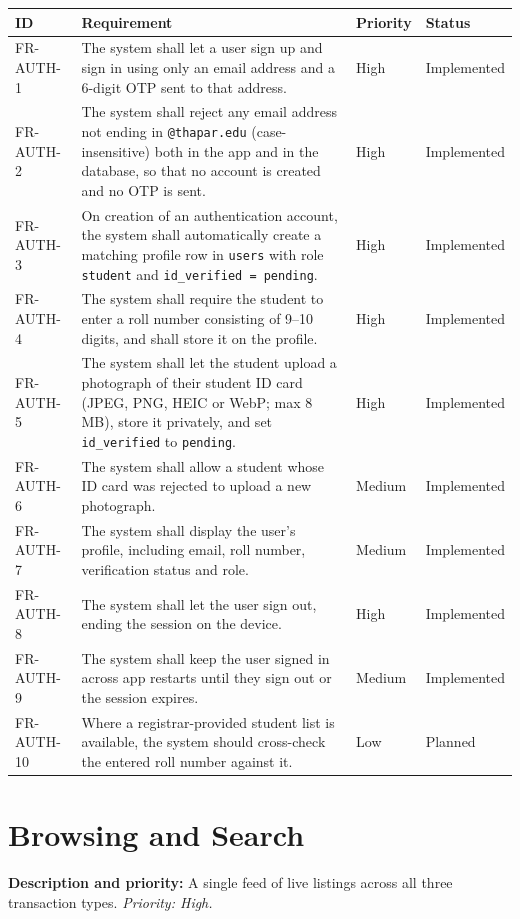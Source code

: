 \documentclass[11pt,a4paper]{scrreprt}
\newenvironment{reqtable}{%
  \small
  \begin{longtable}{>{\raggedright\arraybackslash\ttfamily\footnotesize}p{2.05cm} L{8.85cm} L{1.45cm} L{2.05cm}}
  \toprule
  \normalfont\normalsize\textbf{ID} & \textbf{Requirement} & \textbf{Priority} & \textbf{Status}\\
  \midrule\endhead
  \bottomrule\endfoot
}{\end{longtable}}
\newcommand{\impl}{Implemented}
\newcommand{\planned}{Planned}
\begin{document}
\begin{reqtable}
FR-AUTH-1 & The system shall let a user sign up and sign in using only an email address and a 6-digit OTP sent to that address. & High & \impl\\
FR-AUTH-2 & The system shall reject any email address not ending in \texttt{@thapar.edu} (case-insensitive) both in the app and in the database, so that no account is created and no OTP is sent. & High & \impl\\
FR-AUTH-3 & On creation of an authentication account, the system shall automatically create a matching profile row in \texttt{users} with role \texttt{student} and \texttt{id_verified = pending}. & High & \impl\\
FR-AUTH-4 & The system shall require the student to enter a roll number consisting of 9--10 digits, and shall store it on the profile. & High & \impl\\
FR-AUTH-5 & The system shall let the student upload a photograph of their student ID card (JPEG, PNG, HEIC or WebP; max 8 MB), store it privately, and set \texttt{id_verified} to \texttt{pending}. & High & \impl\\
FR-AUTH-6 & The system shall allow a student whose ID card was rejected to upload a new photograph. & Medium & \impl\\
FR-AUTH-7 & The system shall display the user's profile, including email, roll number, verification status and role. & Medium & \impl\\
FR-AUTH-8 & The system shall let the user sign out, ending the session on the device. & High & \impl\\
FR-AUTH-9 & The system shall keep the user signed in across app restarts until they sign out or the session expires. & Medium & \impl\\
FR-AUTH-10 & Where a registrar-provided student list is available, the system should cross-check the entered roll number against it. & Low & \planned\\
\end{reqtable}

\section{Browsing and Search}
\textbf{Description and priority:} A single feed of live listings across
all three transaction types. \emph{Priority: High.}
\end{document}
